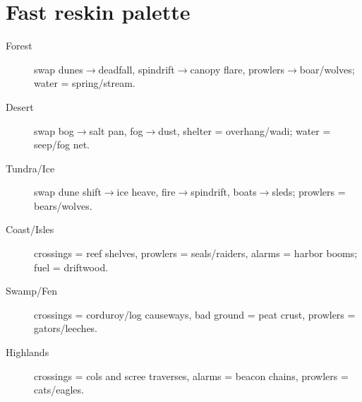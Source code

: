 \section*{Fast reskin palette}
\begin{description}
\item[Forest] swap dunes$\rightarrow$deadfall, spindrift$\rightarrow$canopy flare, prowlers$\rightarrow$boar/wolves; water = spring/stream.
\item[Desert] swap bog$\rightarrow$salt pan, fog$\rightarrow$dust, shelter = overhang/wadi; water = seep/fog net.
\item[Tundra/Ice] swap dune shift$\rightarrow$ice heave, fire$\rightarrow$spindrift, boats$\rightarrow$sleds; prowlers = bears/wolves.
\item[Coast/Isles] crossings = reef shelves, prowlers = seals/raiders, alarms = harbor booms; fuel = driftwood.
\item[Swamp/Fen] crossings = corduroy/log causeways, bad ground = peat crust, prowlers = gators/leeches.
\item[Highlands] crossings = cols and scree traverses, alarms = beacon chains, prowlers = cats/eagles.
\end{description}
